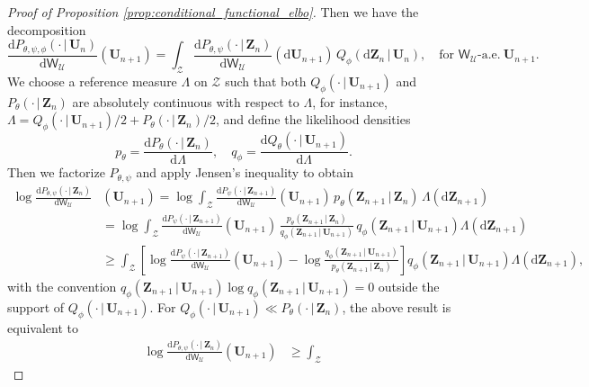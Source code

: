 \documentclass[11pt]{article}
\renewcommand{\d}{\mathrm{d}}
\begin{document}
\begin{proof}[Proof of Proposition \ref{prop:conditional_functional_elbo}]
Then we have the decomposition
\begin{equation}
    \frac{\d P_{\theta,\psi,\phi}(\cdot\,|\,\mathbf{U}_n)}{\d\mathsf{W}_\mathcal{U}}(\mathbf{U}_{n+1})=\int_{\mathcal{Z}}\frac{\d P_{\theta,\psi}(\cdot\,|\,\mathbf{Z}_n)}{\d\mathsf{W}_\mathcal{U}}(\d\mathbf{U}_{n+1})\,Q_\phi(\d\mathbf{Z}_n\,|\,\mathbf{U}_n),\quad\text{for $\mathsf{W}_\mathcal{U}$-a.e.}\ \mathbf{U}_{n+1}.\label{eq:vaedecomp}
\end{equation}
We choose a reference measure $\Lambda$ on $\mathcal{Z}$ such that both $Q_\phi(\cdot\,|\,\mathbf{U}_{n+1})$ and $P_\theta(\cdot\,|\,\mathbf{Z}_n)$ are absolutely continuous with respect to $\Lambda$, for instance, $\Lambda=Q_\phi(\cdot\,|\,\mathbf{U}_{n+1})/2+P_\theta(\cdot\,|\,\mathbf{Z}_n)/2$, and define the likelihood densities
$$p_\theta=\frac{\d P_\theta(\cdot\,|\,\mathbf{Z}_n)}{\d\Lambda},\quad q_\phi=\frac{\d Q_\theta(\cdot\,|\,\mathbf{U}_{n+1})}{\d\Lambda}.$$
Then we factorize $P_{\theta,\psi}$ and apply Jensen's inequality to obtain
\begin{align*}
    \log \frac{\d P_{\theta,\psi}(\cdot\,|\,\mathbf{Z}_n)}{\d\mathsf{W}_\mathcal{U}}&(\mathbf{U}_{n+1})
    =
    \log\int_{\mathcal Z}
    \frac{\d P_\psi(\cdot\,|\, \mathbf Z_{n+1})}{\d\mathsf{W}_\mathcal{U}}(\mathbf U_{n+1})\,
    p_\theta(\mathbf Z_{n+1}\,|\, \mathbf Z_n)\,\Lambda(\d\mathbf{Z}_{n+1})\\
    &=\log\int_{\mathcal Z}
    \frac{\d P_\psi(\cdot\,|\, \mathbf Z_{n+1})}{\d\mathsf{W}_\mathcal{U}}(\mathbf U_{n+1})\,
    \frac{p_\theta(\mathbf Z_{n+1}\,|\, \mathbf Z_n)}{q_\phi(\mathbf Z_{n+1}\,|\, \mathbf U_{n+1})}\,q_\phi(\mathbf Z_{n+1}\,|\, \mathbf U_{n+1})\Lambda(\d\mathbf{Z}_{n+1})\\
    &\geq\int_{\mathcal Z}
    \left[\log \frac{\d P_\psi(\cdot\,|\, \mathbf Z_{n+1})}{\d\mathsf{W}_\mathcal{U}}(\mathbf U_{n+1})-\log
    \frac{q_\phi(\mathbf Z_{n+1}\,|\, \mathbf U_{n+1})}{p_\theta(\mathbf Z_{n+1}\,|\, \mathbf Z_n)}\right]\! q_\phi(\mathbf Z_{n+1}\,|\,\mathbf U_{n+1})\Lambda(\d\mathbf{Z}_{n+1}),
\end{align*}
with the convention $q_\phi(\mathbf Z_{n+1}\,|\, \mathbf U_{n+1})\log q_\phi(\mathbf Z_{n+1}\,|\, \mathbf U_{n+1})=0$ outside the support of $Q_\phi(\cdot\,|\, \mathbf U_{n+1})$. For $Q_\phi(\cdot\,|\,\mathbf{U}_{n+1})\ll P_\theta(\cdot\,|\,\mathbf{Z}_n)$, the above result is equivalent to
\begin{align*}
    \log \frac{\d P_{\theta,\psi}(\cdot\,|\,\mathbf{Z}_n)}{\d\mathsf{W}_\mathcal{U}}(\mathbf{U}_{n+1})&\geq\int_{\mathcal Z}

\end{align*}
\end{proof}
\end{document}
